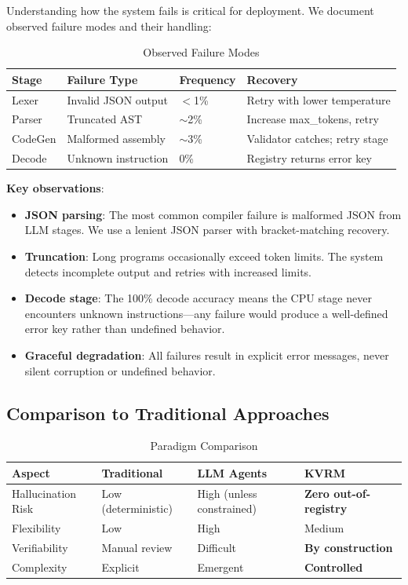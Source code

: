 \documentclass[11pt,a4paper]{article}
\begin{document}
Understanding how the system fails is critical for deployment. We document observed failure modes and their handling:

\begin{table}[H]
\centering
\caption{Observed Failure Modes}
\label{tab:failures}
\begin{tabular}{@{}lllp{4cm}@{}}
\toprule
\textbf{Stage} & \textbf{Failure Type} & \textbf{Frequency} & \textbf{Recovery} \\
\midrule
Lexer & Invalid JSON output & $<$1\% & Retry with lower temperature \\
Parser & Truncated AST & $\sim$2\% & Increase max\_tokens, retry \\
CodeGen & Malformed assembly & $\sim$3\% & Validator catches; retry stage \\
Decode & Unknown instruction & 0\% & Registry returns error key \\
\bottomrule
\end{tabular}
\end{table}

\textbf{Key observations}:
\begin{itemize}
    \item \textbf{JSON parsing}: The most common compiler failure is malformed JSON from LLM stages. We use a lenient JSON parser with bracket-matching recovery.
    \item \textbf{Truncation}: Long programs occasionally exceed token limits. The system detects incomplete output and retries with increased limits.
    \item \textbf{Decode stage}: The 100\% decode accuracy means the CPU stage never encounters unknown instructions---any failure would produce a well-defined error key rather than undefined behavior.
    \item \textbf{Graceful degradation}: All failures result in explicit error messages, never silent corruption or undefined behavior.
\end{itemize}

\subsection{Comparison to Traditional Approaches}

\begin{table}[H]
\centering
\caption{Paradigm Comparison}
\label{tab:comparison}
\begin{tabular}{@{}llll@{}}
\toprule
\textbf{Aspect} & \textbf{Traditional} & \textbf{LLM Agents} & \textbf{KVRM} \\
\midrule
Hallucination Risk & Low (deterministic) & High (unless constrained) & \textbf{Zero out-of-registry} \\
Flexibility & Low & High & Medium \\
Verifiability & Manual review & Difficult & \textbf{By construction} \\
Complexity & Explicit & Emergent & \textbf{Controlled} \\
\bottomrule
\end{tabular}
\end{table}
\end{document}
